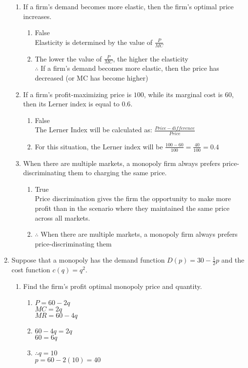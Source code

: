 \documentclass[11pt]{article}
\begin{document}
\begin{enumerate}
\begin{enumerate}
	
	\item If a firm's demand becomes more elastic, then the firm's optimal price increases.
	\begin{enumerate}
        \item False\\
        Elasticity is determined by the value of $\frac{P}{MC}$
        \item The lower the value of $\frac{P}{MC}$, the higher the elasticity\\
        $\therefore$ If a firm's demand becomes more elastic, then the price has decreased (or MC has become higher)
    \end{enumerate}
	

	\item If a firm's profit-maximizing price is $100$, while its marginal cost is $60$, then its Lerner index is equal to $0.6$.
	\begin{enumerate}
        \item False\\
        The Lerner Index will be calculated as: $\frac{Price-difference}{Price}$
        \item For this situation, the Lerner index will be $\frac{100-60}{100}=\frac{40}{100}=0.4$
    \end{enumerate}
	

    \item When there are multiple markets, a monopoly firm always prefers price-discriminating them to charging the same price.
    \begin{enumerate}
        \item True\\
        Price discrimination gives the firm the opportunity to make more profit than in the scenario where they maintained the same price across all markets.
        \item $\therefore$ When there are multiple markets, a monopoly firm always prefers price-discriminating them
    \end{enumerate}
	

    \end{enumerate}

\pagebreak
\item Suppose that a monopoly has the demand function $D(p)=30-\frac{1}{2}p$ and the cost function $c(q)=q^{2}$.
	\begin{enumerate}
    \item Find the firm's profit optimal monopoly price and quantity.
    \begin{enumerate}
        \item $P=60-2q$\\
        $MC = 2q$\\
        $MR = 60-4q$
        \item $60-4q = 2q$\\
        $60 = 6q$
        \item $\therefore q = 10$\\
        $p = 60-2(10) = 40$
    \end{enumerate}
	

\end{enumerate}
\end{enumerate}
\end{document}
